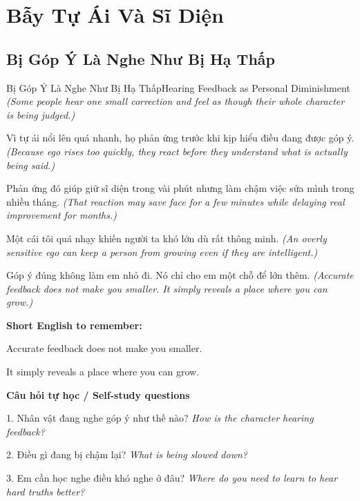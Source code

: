 \chapter{Bẫy Tự Ái Và Sĩ Diện}

\section{Bị Góp Ý Là Nghe Như Bị Hạ Thấp}
\begin{truyen}{Bị Góp Ý Là Nghe Như Bị Hạ Thấp}{Hearing Feedback as Personal Diminishment}
\textit{(Some people hear one small correction and feel as though their whole character is being judged.)}

Vì tự ái nổi lên quá nhanh, họ phản ứng trước khi kịp hiểu điều đang được góp ý.
\textit{(Because ego rises too quickly, they react before they understand what is actually being said.)}

Phản ứng đó giúp giữ sĩ diện trong vài phút nhưng làm chậm việc sửa mình trong nhiều tháng.
\textit{(That reaction may save face for a few minutes while delaying real improvement for months.)}

Một cái tôi quá nhạy khiến người ta khó lớn dù rất thông minh.
\textit{(An overly sensitive ego can keep a person from growing even if they are intelligent.)}

\end{truyen}

\begin{baihoc}
Góp ý đúng không làm em nhỏ đi. Nó chỉ cho em một chỗ để lớn thêm.
\textit{(Accurate feedback does not make you smaller. It simply reveals a place where you can grow.)}
\end{baihoc}

\begin{ghinhoanh}
\textbf{Short English to remember:}

Accurate feedback does not make you smaller.

It simply reveals a place where you can grow.

\end{ghinhoanh}

\begin{tuhocnhanh}
\textbf{Câu hỏi tự học / Self-study questions}

1. Nhân vật đang nghe góp ý như thế nào? \textit{How is the character hearing feedback?}

2. Điều gì đang bị chậm lại? \textit{What is being slowed down?}

3. Em cần học nghe điều khó nghe ở đâu? \textit{Where do you need to learn to hear hard truths better?}
\end{tuhocnhanh}
\ngancach

